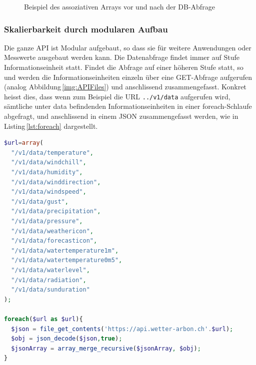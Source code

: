 \begin{figure}[htbp!]
	\centering
	\caption{Beispiel des assoziativen Arrays vor und nach der DB-Abfrage}
	\label{img:assozArray}
\end{figure}


\noindent
{}


\subsubsection{Skalierbarkeit durch modularen Aufbau}
Die ganze API ist Modular aufgebaut, so dass sie für weitere Anwendungen oder Messwerte ausgebaut werden kann. Die Datenabfrage findet immer auf Stufe Informationseinheit statt. Findet die Abfrage auf einer höheren Stufe statt, so und werden die Informationseinheiten einzeln über eine GET-Abfrage aufgerufen (analog Abbildung\,\ref{img:APIFiles}) und anschlissend zusammengefasst. Konkret heisst dies, dass wenn zum Beispiel die URL \texttt{../v1/data} aufgerufen wird, sämtliche unter data befindenden Informationseinheiten in einer foreach-Schlaufe abgefragt, und anschlissend in einem JSON zusammengefasst werden, wie in Listing\,\ref{lst:foreach} dargestellt.

\vspace{3mm}
\begin{lstlisting}[label=lst:foreach,caption=API-Abfrage auf Stufe Kategorie, language=php, style=php]
$url=array(
  "/v1/data/temperature",
  "/v1/data/windchill",
  "/v1/data/humidity",
  "/v1/data/winddirection",
  "/v1/data/windspeed",
  "/v1/data/gust",
  "/v1/data/precipitation",
  "/v1/data/pressure",
  "/v1/data/weathericon",
  "/v1/data/forecasticon",
  "/v1/data/watertemperature1m",
  "/v1/data/watertemperature0m5",
  "/v1/data/waterlevel",
  "/v1/data/radiation",
  "/v1/data/sunduration"
);

foreach($url as $url){
  $json = file_get_contents('https://api.wetter-arbon.ch'.$url);
  $obj = json_decode($json,true);
  $jsonArray = array_merge_recursive($jsonArray, $obj);
}
\end{lstlisting}
\vspace{3mm}



